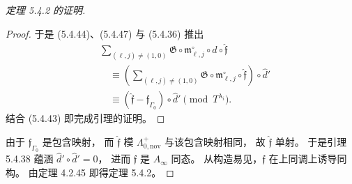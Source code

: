 \begin{proof}[定理 5.4.2 的证明]
\begin{proof}
于是 (5.4.44)、(5.4.47) 与 (5.4.36)
推出
\[
\begin{aligned}
&\sum_{(\ell,j)\ne(1,0)}
\mathfrak G\circ\mathfrak m^\circ_{\ell,j}
\circ\widehat d\circ\widehat{\mathfrak f}\\
&\quad\equiv
\left(\sum_{(\ell,j)\ne(1,0)}
\mathfrak G\circ\mathfrak m^\circ_{\ell,j}
\circ\widehat{\mathfrak f}\right)
\circ\widehat d'\\
&\quad\equiv
(\widehat{\mathfrak f}
-\mathfrak f_{\Gamma_0})\circ\widehat d'
\pmod{T^{\lambda_i}}.
\end{aligned}
\]
结合 (5.4.43) 即完成引理的证明。
\end{proof}

由于 $\mathfrak f_{\Gamma_0}$ 是包含映射，
而 $\widehat{\mathfrak f}$ 模
$\Lambda^+_{0,\mathrm{nov}}$ 与该包含映射相同，
故 $\widehat{\mathfrak f}$ 单射。
于是引理 5.4.38 蕴涵
$\widehat d'\circ\widehat d'=0$，
进而 $\mathfrak f$ 是 $A_\infty$ 同态。
从构造易见，$\mathfrak f$
在上同调上诱导同构。
由定理 4.2.45 即得定理 5.4.2。
\end{proof}

